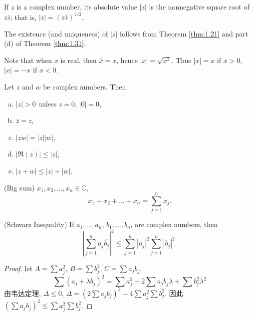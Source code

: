 \begin{mydef}
    \label{mydef:1.32}
    If $z$ is a complex number, 
    its absolute value $|z|$ is the nonnegative square root of $z\bar{z}$; 
    that is, $|z| = (z\bar{z})^{1/2}$.
\end{mydef}
The existence (and uniqueness) of $|z|$ follows from Theorem \ref{thm:1.21} and part (d) of Theorem \ref{thm:1.31}.

Note that when $x$ is real, then $\bar{x} = x$, 
hence $|x| = \sqrt{x^2}$. Thus $|x| = x$
if $x>0$, $|x| = -x$ if $x <0$.

\begin{thm}
    \label{thm:1.33}
    Let $z$ and $w$ be complex numbers. Then
    \begin{enumerate}[(a)]
        \item $|z|>0$ unless $z=0$, $|0|=0$,
        \item $\bar{z}=z$,
        \item $|zw| = |z||w|$,
        \item $| \Re(z)| \leq |z|$,
        \item $|z+w| \leq|z|+|w|$.
    \end{enumerate}
\end{thm}


\begin{myNotation}(Big sum)
    \label{myNotation:1.34}
    $x_1,x_2,\dots,x_n \in \mathbb{C}$,
    \begin{equation*}
        x_1+x_2+\dots+x_n = \sum_{j=1}^{n} x_j.
    \end{equation*}
\end{myNotation}

\begin{thm}(Schwarz Inequality)
    \label{thm:1.35}
    If 
    $a_1,\dots,a_n$, 
    $b_1,\dots,b_n$, are complex numbers, then
    \begin{equation*}
        \left| \sum_{j=1}^{n}a_j \bar{b_j}\right|^2 \leq 
        \sum_{j=1}^{n}\left|a_j\right|^2
        \sum_{j=1}^{n}\left|b_j\right|^2.
    \end{equation*}    
\end{thm}

\begin{proof}
    let $A = \sum a_j^2$, $B = \sum b_j^2$, $C = \sum a_j b_j$.
    \begin{equation*}
        \sum (a_j+\lambda b_j)^2 = 
        \sum a_j^2 
        + 2\sum a_j b_j \lambda
        + \sum b_j^2 \lambda^2
    \end{equation*}
    由韦达定理, $\Delta \leq 0$, 
    $\Delta= (2\sum a_j b_j )^2 - 4 \sum a_j^2\sum b_j^2$. 
    因此 $(\sum a_j b_j )^2 \leq \sum a_j^2\sum b_j^2$.
\end{proof}


